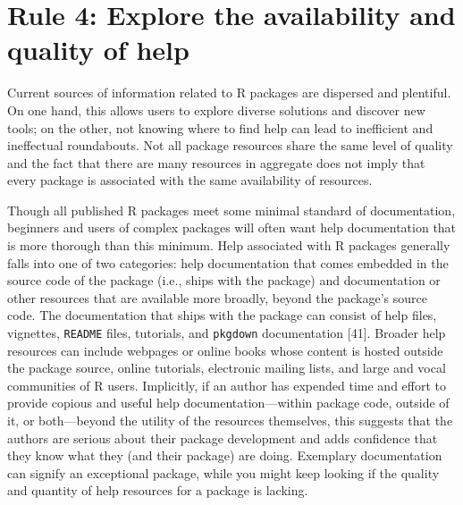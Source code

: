 \documentclass[10pt,letterpaper]{article}
\begin{document}
\hypertarget{rule-4-explore-the-availability-and-quality-of-help}{%
\section{Rule 4: Explore the availability and quality of
help}\label{rule-4-explore-the-availability-and-quality-of-help}}

Current sources of information related to R packages are dispersed and
plentiful. On one hand, this allows users to explore diverse solutions
and discover new tools; on the other, not knowing where to find help can
lead to inefficient and ineffectual roundabouts. Not all package
resources share the same level of quality and the fact that there are
many resources in aggregate does not imply that every package is
associated with the same availability of resources.

Though all published R packages meet some minimal standard of
documentation, beginners and users of complex packages will often want
help documentation that is more thorough than this minimum. Help
associated with R packages generally falls into one of two categories:
help documentation that comes embedded in the source code of the package
(i.e., ships with the package) and documentation or other resources that
are available more broadly, beyond the package's source code. The
documentation that ships with the package can consist of help files,
vignettes, \texttt{README} files, tutorials, and \texttt{pkgdown}
documentation {[}41{]}. Broader help resources can include webpages or
online books whose content is hosted outside the package source, online
tutorials, electronic mailing lists, and large and vocal communities of
R users. Implicitly, if an author has expended time and effort to
provide copious and useful help documentation---within package code,
outside of it, or both---beyond the utility of the resources themselves,
this suggests that the authors are serious about their package
development and adds confidence that they know what they (and their
package) are doing. Exemplary documentation can signify an exceptional
package, while you might keep looking if the quality and quantity of
help resources for a package is lacking.
\end{document}
